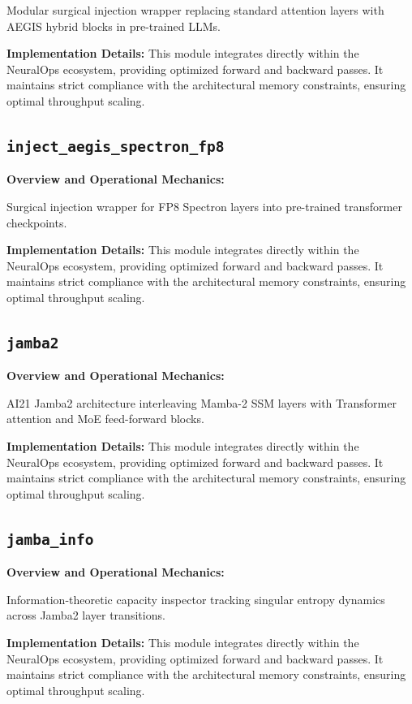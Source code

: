 \documentclass[10pt,twocolumn,letterpaper]{article}
\begin{document}
Modular surgical injection wrapper replacing standard attention layers with AEGIS hybrid blocks in pre-trained LLMs.

\textbf{Implementation Details:}
This module integrates directly within the NeuralOps ecosystem, providing optimized forward and backward passes. It maintains strict compliance with the architectural memory constraints, ensuring optimal throughput scaling.

\subsection{\texttt{inject\_aegis\_spectron\_fp8}}
\textbf{Overview and Operational Mechanics:}

Surgical injection wrapper for FP8 Spectron layers into pre-trained transformer checkpoints.

\textbf{Implementation Details:}
This module integrates directly within the NeuralOps ecosystem, providing optimized forward and backward passes. It maintains strict compliance with the architectural memory constraints, ensuring optimal throughput scaling.

\subsection{\texttt{jamba2}}
\textbf{Overview and Operational Mechanics:}

AI21 Jamba2 architecture interleaving Mamba-2 SSM layers with Transformer attention and MoE feed-forward blocks.

\textbf{Implementation Details:}
This module integrates directly within the NeuralOps ecosystem, providing optimized forward and backward passes. It maintains strict compliance with the architectural memory constraints, ensuring optimal throughput scaling.

\subsection{\texttt{jamba\_info}}
\textbf{Overview and Operational Mechanics:}

Information-theoretic capacity inspector tracking singular entropy dynamics across Jamba2 layer transitions.

\textbf{Implementation Details:}
This module integrates directly within the NeuralOps ecosystem, providing optimized forward and backward passes. It maintains strict compliance with the architectural memory constraints, ensuring optimal throughput scaling.
\end{document}
